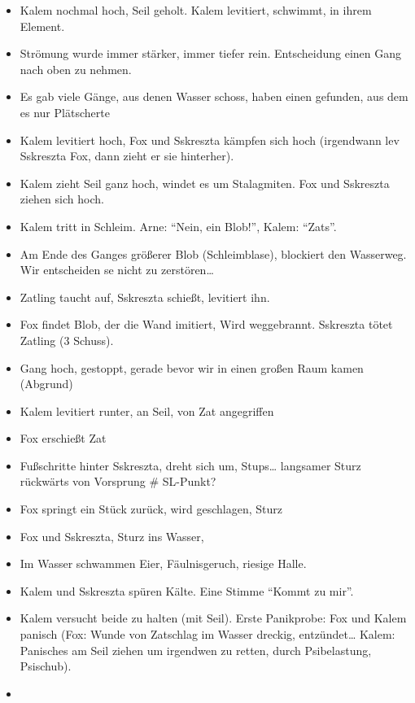 \documentclass[11pt]{article}
\begin{document}
\begin{itemize}
  \begin{itemize}
  \item
    Kalem nochmal hoch, Seil geholt. Kalem levitiert, schwimmt, in ihrem
    Element.
  \item
    Strömung wurde immer stärker, immer tiefer rein. Entscheidung einen
    Gang nach oben zu nehmen.
  \item
    Es gab viele Gänge, aus denen Wasser schoss, haben einen gefunden,
    aus dem es nur Plätscherte
  \item
    Kalem levitiert hoch, Fox und Sskreszta kämpfen sich hoch
    (irgendwann lev Sskreszta Fox, dann zieht er sie hinterher).
  \item
    Kalem zieht Seil ganz hoch, windet es um Stalagmiten. Fox und
    Sskreszta ziehen sich hoch.
  \item
    Kalem tritt in Schleim. Arne: ``Nein, ein Blob!'', Kalem: ``Zats''.
  \item
    Am Ende des Ganges größerer Blob (Schleimblase), blockiert den
    Wasserweg. Wir entscheiden se nicht zu zerstören\ldots{}
  \item
    Zatling taucht auf, Sskreszta schießt, levitiert ihn.
  \item
    Fox findet Blob, der die Wand imitiert, Wird weggebrannt. Sskreszta
    tötet Zatling (3 Schuss).
  \item
    Gang hoch, gestoppt, gerade bevor wir in einen großen Raum kamen
    (Abgrund)
  \item
    Kalem levitiert runter, an Seil, von Zat angegriffen
  \item
    Fox erschießt Zat
  \item
    Fußschritte hinter Sskreszta, dreht sich um, Stups\ldots{} langsamer
    Sturz rückwärts von Vorsprung \# SL-Punkt?
  \item
    Fox springt ein Stück zurück, wird geschlagen, Sturz
  \item
    Fox und Sskreszta, Sturz ins Wasser,
  \item
    Im Wasser schwammen Eier, Fäulnisgeruch, riesige Halle.
  \item
    Kalem und Sskreszta spüren Kälte. Eine Stimme ``Kommt zu mir''.
  \item
    Kalem versucht beide zu halten (mit Seil). Erste Panikprobe: Fox und
    Kalem panisch (Fox: Wunde von Zatschlag im Wasser dreckig,
    entzündet\ldots{} Kalem: Panisches am Seil ziehen um irgendwen zu
    retten, durch Psibelastung, Psischub).
  \item

\end{itemize}
\end{itemize}
\end{document}
